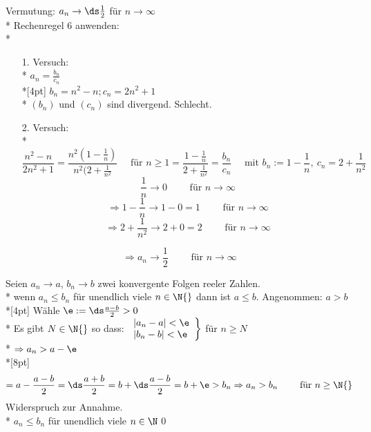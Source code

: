\vspace{5mm}
Vermutung: $a_n \to \ds\frac{1}{2}$ für $n \to ∞$\\*
Rechenregel 6 anwenden:\\*
\begin{itemize}
\item[1.]{Versuch:\\*
$a_n = \frac{b_n}{c_n}$\\*[4pt]
$b_n = n^2 -n; c_n = 2n^2 + 1$\\*
$(b_n)$ und $(c_n)$ sind divergend. Schlecht.}
\item[2.]{Versuch:\\*
$$\frac{n^2 - n}{2n^2 + 1} = \frac{n^2(1 - \frac{1}{n})}{n^2(2 + \frac{1}{n^2}}\quad\text{ für }n \geq 1= \frac{1-\frac{1}{n}}{2 +\frac{1}{n^2}}=\frac{b_n}{c_n}\quad\text{ mit }b_n:=1-\frac{1}{n},\ c_n = 2 + \frac{1}{n^2}$$
$$\frac{1}{n} \to 0\qquad\text{ für }n \to ∞ $$
$$\Rightarrow 1 - \frac{1}{n} \to 1 - 0 = 1\qquad\text{ für }n \to ∞$$
$$\Rightarrow 2 +\frac{1}{n^2}\to 2 + 0 = 2\qquad\text{ für }n \to ∞$$}
\end{itemize}
$$\Rightarrow a_n \to \frac{1}{2}\qquad\text{ für }n \to ∞$$

Seien $a_n \to a$, $b_n \to b$ zwei konvergente Folgen reeler Zahlen.\\*
wenn $a_n \leq b_n$ für unendlich viele $n \in \N{}$ dann ist $a \leq b$.
\bew
Angenommen: $a > b$\\*[4pt]
Wähle $\e := \ds\frac{a - b}{2} > 0$\\*
Es gibt $N \in \N{}$ so dass:
$\left.
\begin{array}{ll}
| a_n - a | < \e \\*
| b_n - b | < \e
\end{array} \right\rbrace$ für $n \geq N$\\*
$\Rightarrow a_n > a - \e$\\*[8pt]
$$= a - \frac{a - b}{2} = \ds\frac{a + b}{2} = b + \ds\frac{a - b}{2}= b + \e > b_n \Rightarrow a_n > b_n\qquad\text{ für }n \geq \N{}$$
Widerspruch zur Annahme.\\*
$a_n \leq b_n$ für unendlich viele $n \in \N$\qed

